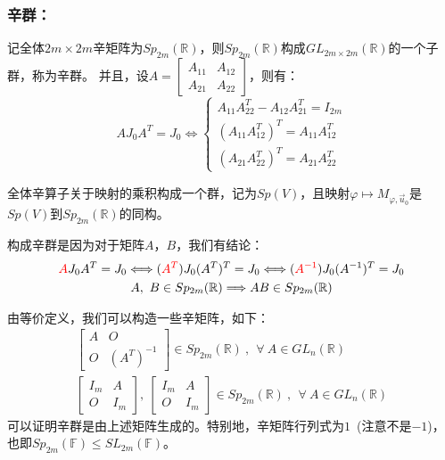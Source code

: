 \documentclass[zihao=5,UTF8]{report}
\theoremstyle{mystyle} %
\begin{document}
\subsubsection{辛群：}
记全体$2m\times 2m$辛矩阵为$Sp_{2m}(\mathbb{R})$，则$Sp_{2m}(\mathbb{R})$构成$GL_{2m\times 2m}(\mathbb{R})$的一个子群，称为辛群。
并且，设$A = \begin{bmatrix}
    A_{11}&A_{12}\\
    A_{21}&A_{22}
\end{bmatrix}$，则有：
\begin{equation*}
    AJ_0A^T = J_0  \Longleftrightarrow \begin{cases}
        A_{11}A_{22}^T - A_{12}A_{21}^T = I_{2m}\\
        (A_{11}A_{12}^T)^T = A_{11}A_{12}^T\\
        (A_{21}A_{22}^T)^T = A_{21}A_{22}^T
    \end{cases}
\end{equation*}\par
全体辛算子关于映射的乘积构成一个群，记为$Sp(V)$，且映射$\varphi \longmapsto M_{\varphi,\vec{u}_0}$是$Sp(V)$到$Sp_{2m}(\mathbb{R})$的同构。
{\par\color{gray}\small
构成辛群是因为对于矩阵$A$，$B$，我们有结论：
\begin{gather*}
    \textcolor{red}{A}J_0A^T = J_0 \Longleftrightarrow (\textcolor{red}{A^T})J_0(A^T)^T = J_0 \Longleftrightarrow (\textcolor{red}{A^{-1}})J_0(A^{-1})^T = J_0\\
    A,\ B \in Sp_{2m}(\mathbb{R})\Longrightarrow AB \in Sp_{2m}(\mathbb{R})
\end{gather*}\par 
\par}
{\par\color{gray}\small
由等价定义，我们可以构造一些辛矩阵，如下：
\begin{gather*}
    \begin{bmatrix}
        A  & O\\
        O & (A^T)^{-1}
    \end{bmatrix} \in Sp_{2m}(\mathbb{R})\ ,\ \  \forall\ A \in GL_n(\mathbb{R})\\
    \begin{bmatrix}
        I_m & A\\
        O & I_m
    \end{bmatrix},\ 
    \begin{bmatrix}
        I_m & A\\
        O & I_m
    \end{bmatrix} \in Sp_{2m}(\mathbb{R})\ ,\ \  \forall\ A \in GL_n(\mathbb{R}) 
\end{gather*}
可以证明辛群是由上述矩阵生成的。特别地，辛矩阵行列式为$1$\ (注意不是$-1$)，也即$Sp_{2m}(\mathbb{F}) \le SL_{2m}(\mathbb{F})$。
\par}
\end{document}
